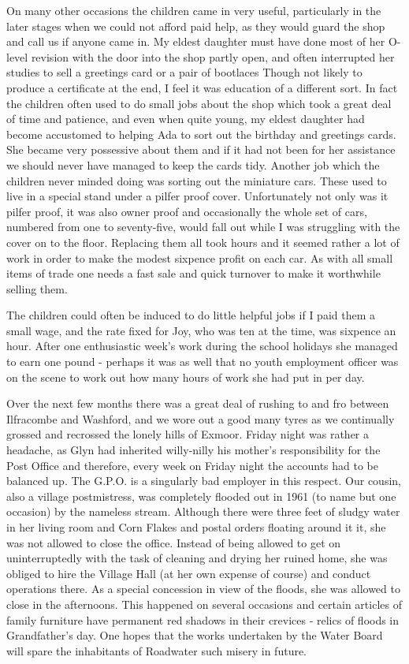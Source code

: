 On many other occasions the children came in very useful, particularly in the later stages when we could not afford paid help, as they would guard the shop and call us if anyone came in. My eldest daughter must have done most of her O-level revision with the door into the shop partly open, and often interrupted her studies to sell a greetings card or a pair of bootlaces Though not likely to produce a certificate at the end, I feel it was education of a different sort. In fact the children often used to do small jobs about the shop which took a great deal of time and patience, and even when quite young, my eldest daughter had become accustomed to helping Ada to sort out the birthday and greetings cards. She became very possessive about them and if it had not been for her assistance we should never have managed to keep the cards tidy. Another job which the children never minded doing was sorting out the miniature cars. These used to live in a special stand under a pilfer proof cover. Unfortunately not only was it pilfer proof, it was also owner proof and occasionally the whole set of cars, numbered from one to seventy-five, would fall out while I was struggling with the cover on to the floor. Replacing them all took hours and it seemed rather a lot of work in order to make the modest sixpence profit on each car. As with all small items of trade one needs a fast sale and quick turnover to make it worthwhile selling them.
	
The children could often be induced to do little helpful jobs if I paid them a small wage, and the rate fixed for Joy, who was ten at the time, was sixpence an hour. After one enthusiastic week's work during the school holidays she managed to earn one pound - perhaps it was as well that no youth employment officer was on the scene to work out how many hours of work she had put in per day.

Over the next few months there was a great deal of rushing to and fro between Ilfracombe and Washford, and we wore out a good many tyres as we continually grossed and recrossed the lonely hills of Exmoor. Friday night was rather a headache, as Glyn had inherited willy-nilly his mother's responsibility for the Post Office and therefore, every week on Friday night the accounts had to be balanced up. The G.P.O. is a singularly bad employer in this respect. Our cousin, also a village postmistress, was completely flooded out in 1961 (to name but one occasion) by the nameless stream. Although there were three feet of sludgy water in her living room and Corn Flakes and postal orders floating around it it, she was not allowed to close the office. Instead of being allowed to get on uninterruptedly with the task of cleaning and drying her ruined home, she was obliged to hire the Village Hall (at her own expense of course) and conduct operations there. As a special concession in view of the floods, she was allowed to close in the afternoons. This happened on several occasions and certain articles of family furniture have permanent red shadows in their crevices - relics of floods in Grandfather's day. One hopes that the works undertaken by the Water Board will spare the inhabitants of Roadwater such misery in future.

